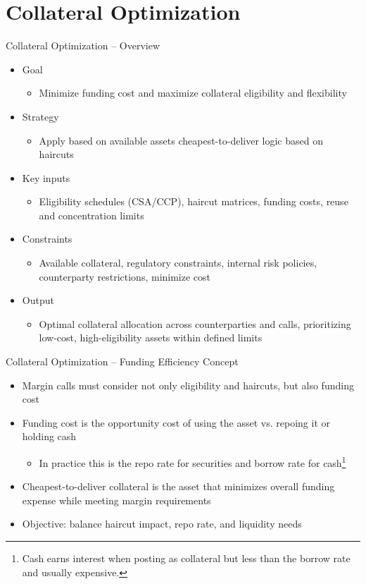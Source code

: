 \documentclass[handout, aspectratio=169]{beamer}
\begin{document}
\section{Collateral Optimization}
\begin{frame}{Collateral Optimization – Overview}
  \begin{itemize}
    \item Goal
    \begin{itemize}
      \item Minimize funding cost and maximize collateral eligibility and flexibility
    \end{itemize}
    \item Strategy
    \begin{itemize}
      \item  Apply based on available assets cheapest-to-deliver logic based on haircuts
    \end{itemize}
    \item Key inputs
    \begin{itemize}
      \item  Eligibility schedules (CSA/CCP), haircut matrices, funding costs, reuse and concentration limits
    \end{itemize}
    \item Constraints
    \begin{itemize}
      \item  Available collateral, regulatory constraints, internal risk policies, counterparty restrictions, minimize cost
    \end{itemize}
    \item Output
    \begin{itemize}
      \item  Optimal collateral allocation across counterparties and calls, prioritizing low-cost, high-eligibility assets within defined limits
    \end{itemize}
  \end{itemize}
\end{frame}

\begin{frame}{Collateral Optimization – Funding Efficiency Concept}
  \begin{itemize}
    \item Margin calls must consider not only eligibility and haircuts, but also funding cost
    \item Funding cost is the opportunity cost of using the asset vs. repoing it or holding cash
    \begin{itemize}
      \item In practice this is the repo rate for securities and borrow rate for cash\footnote{Cash earns interest when posting as collateral but less than the borrow rate and usually expensive.}
    \end{itemize}
    \item Cheapest-to-deliver collateral is the asset that minimizes overall funding expense while meeting margin requirements
    \item Objective: balance haircut impact, repo rate, and liquidity needs
  \end{itemize}
\end{frame}
\end{document}
